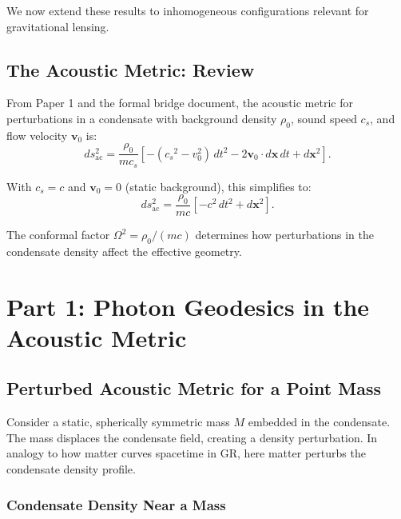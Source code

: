 \documentclass[11pt,a4paper]{article}
\newcommand{\cs}{\ensuremath{c_s}}
\theoremstyle{definition}
\theoremstyle{remark}
\begin{document}
We now extend these results to inhomogeneous configurations relevant for gravitational lensing.

\subsection{The Acoustic Metric: Review}

From Paper 1 and the formal bridge document, the acoustic metric for perturbations in a condensate with background density $\rho_0$, sound speed $\cs$, and flow velocity $\mathbf{v}_0$ is:
\begin{equation}
\label{eq:acoustic_metric_review}
ds_{\mathrm{ac}}^2 = \frac{\rho_0}{m \cs} \left[ -(\cs^2 - v_0^2) \, dt^2 - 2 \mathbf{v}_0 \cdot d\mathbf{x} \, dt + d\mathbf{x}^2 \right].
\end{equation}

With $\cs = c$ and $\mathbf{v}_0 = 0$ (static background), this simplifies to:
\begin{equation}
\label{eq:acoustic_static}
ds_{\mathrm{ac}}^2 = \frac{\rho_0}{m c} \left[ -c^2 \, dt^2 + d\mathbf{x}^2 \right].
\end{equation}

The conformal factor $\Omega^2 = \rho_0/(mc)$ determines how perturbations in the condensate density affect the effective geometry.

\section{Part 1: Photon Geodesics in the Acoustic Metric}
\label{sec:photon_geodesics}

\subsection{Perturbed Acoustic Metric for a Point Mass}
\label{sec:perturbed_metric}

Consider a static, spherically symmetric mass $M$ embedded in the condensate. The mass displaces the condensate field, creating a density perturbation. In analogy to how matter curves spacetime in GR, here matter perturbs the condensate density profile.

\subsubsection{Condensate Density Near a Mass}
\end{document}
